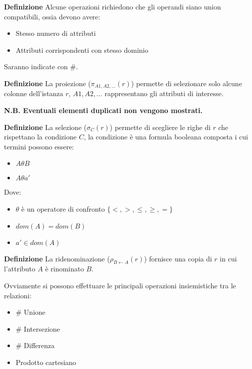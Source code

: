 \documentclass{article}
\begin{document}
\textbf{Definizione} Alcune operazioni richiedono che gli operandi siano union compatibili, ossia devono avere:
\begin{itemize}
    \item Stesso numero di attributi
    \item Attributi corrispondenti con stesso dominio
\end{itemize}

\noindent Saranno indicate con \#.\newline

\noindent\textbf{Definizione} La proiezione ($\pi_{A1,A2,\ldots}(r)$) permette di selezionare solo alcune colonne dell'istanza $r$, $A1,A2,\ldots$ rappresentano gli attributi di interesse.\newline

\noindent\textbf{N.B. Eventuali elementi duplicati non vengono mostrati.}\newline

\noindent\textbf{Definizione} La selezione ($\sigma_C(r)$) permette di scegliere le righe di $r$ che rispettano la condizione $C$, la condizione è una formula booleana composta i cui termini possono essere:
\begin{itemize}
    \item $A\theta B$
    \item $A\theta a'$
\end{itemize}

\noindent Dove:
\begin{itemize}
    \item $\theta$ è un operatore di confronto $\{<,>,\leq,\geq,=\}$
    \item $dom(A)=dom(B)$
    \item $a'\in dom(A)$\newline
\end{itemize}

\noindent\textbf{Definizione} La ridenominazione ($\rho_{B\leftarrow A}(r)$) fornisce una copia di $r$ in cui l'attributo $A$ è rinominato $B$.\newline

\noindent Ovviamente si possono effettuare le principali operazioni insiemistiche tra le relazioni:
\begin{itemize}
    \item \# Unione
    \item \# Intersezione
    \item \# Differenza
    \item Prodotto cartesiano\newline
    
\end{itemize}
\end{document}
